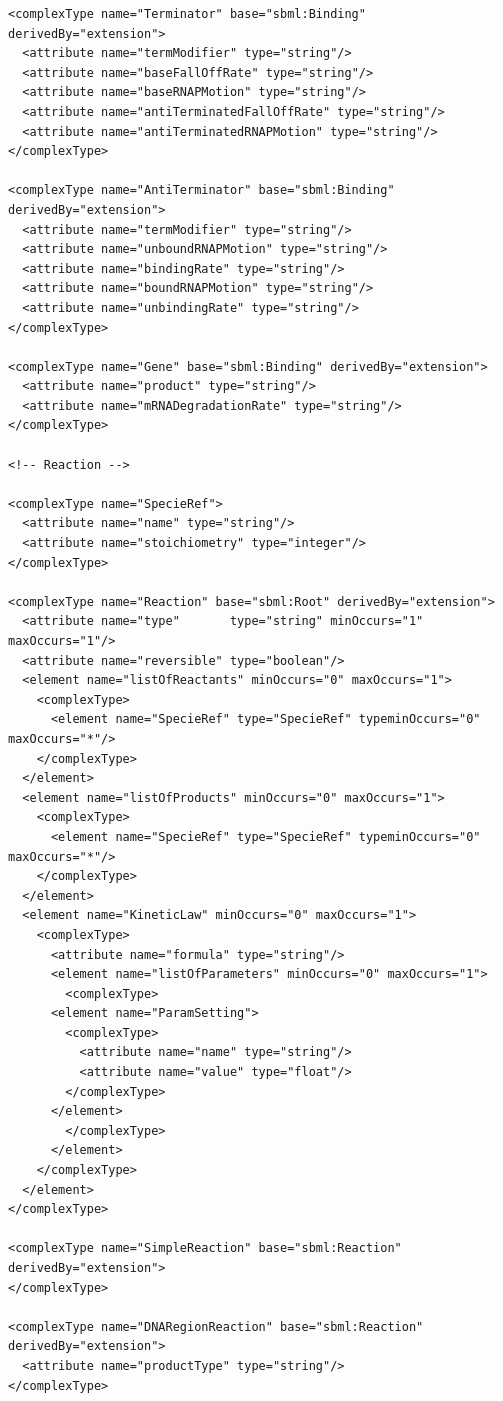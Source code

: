 \documentclass[10pt]{article}
\begin{document}
\begin{small}
\begin{verbatim}
<complexType name="Terminator" base="sbml:Binding" derivedBy="extension">
  <attribute name="termModifier" type="string"/>
  <attribute name="baseFallOffRate" type="string"/>
  <attribute name="baseRNAPMotion" type="string"/>
  <attribute name="antiTerminatedFallOffRate" type="string"/>
  <attribute name="antiTerminatedRNAPMotion" type="string"/>
</complexType>

<complexType name="AntiTerminator" base="sbml:Binding" derivedBy="extension">
  <attribute name="termModifier" type="string"/>
  <attribute name="unboundRNAPMotion" type="string"/>
  <attribute name="bindingRate" type="string"/>
  <attribute name="boundRNAPMotion" type="string"/>
  <attribute name="unbindingRate" type="string"/>
</complexType>

<complexType name="Gene" base="sbml:Binding" derivedBy="extension">
  <attribute name="product" type="string"/>
  <attribute name="mRNADegradationRate" type="string"/>
</complexType>

<!-- Reaction -->

<complexType name="SpecieRef">
  <attribute name="name" type="string"/>
  <attribute name="stoichiometry" type="integer"/>
</complexType>

<complexType name="Reaction" base="sbml:Root" derivedBy="extension">
  <attribute name="type"       type="string" minOccurs="1" maxOccurs="1"/>
  <attribute name="reversible" type="boolean"/>
  <element name="listOfReactants" minOccurs="0" maxOccurs="1">
    <complexType>
      <element name="SpecieRef" type="SpecieRef" typeminOccurs="0" maxOccurs="*"/>
    </complexType>
  </element>
  <element name="listOfProducts" minOccurs="0" maxOccurs="1">
    <complexType>
      <element name="SpecieRef" type="SpecieRef" typeminOccurs="0" maxOccurs="*"/>
    </complexType>
  </element>
  <element name="KineticLaw" minOccurs="0" maxOccurs="1">
    <complexType>
      <attribute name="formula" type="string"/>
      <element name="listOfParameters" minOccurs="0" maxOccurs="1">
        <complexType>
	  <element name="ParamSetting">
	    <complexType>
	      <attribute name="name" type="string"/>
	      <attribute name="value" type="float"/>
	    </complexType>
	  </element>
        </complexType>
      </element>
    </complexType>
  </element>
</complexType>

<complexType name="SimpleReaction" base="sbml:Reaction" derivedBy="extension">
</complexType>

<complexType name="DNARegionReaction" base="sbml:Reaction" derivedBy="extension">
  <attribute name="productType" type="string"/>
</complexType>


\end{verbatim}
\end{small}
\end{document}
